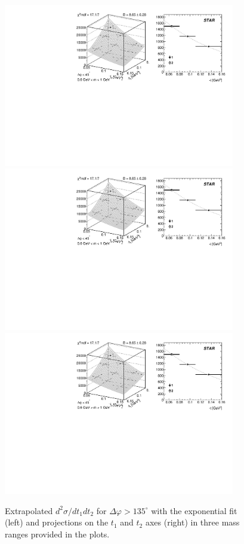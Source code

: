\begin{figure}%
\centering
\includegraphics[width=0.9\textwidth,page=4]{graphics/physicsResults/SlopeExtraction.pdf}\\[7pt]
\includegraphics[width=0.9\textwidth,page=5]{graphics/physicsResults/SlopeExtraction.pdf}\\[7pt]
\includegraphics[width=0.9\textwidth,page=6]{graphics/physicsResults/SlopeExtraction.pdf}
%
\caption{Extrapolated $d^{2}\sigma/dt_{1}dt_{2}$ for $\Delta\varphi>135^{\circ}$ with the exponential fit (left) and projections on the $t_{1}$ and $t_{2}$ axes (right) in three mass ranges provided in the plots.}
\label{fig:slope_2}
\end{figure}
